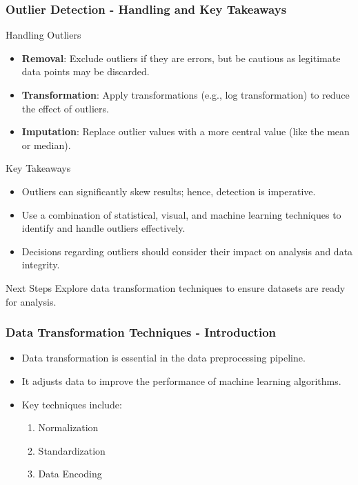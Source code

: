 \documentclass[aspectratio=169]{beamer}
\begin{document}
\begin{frame}[fragile]
    \frametitle{Outlier Detection - Handling and Key Takeaways}
    \begin{block}{Handling Outliers}
        \begin{itemize}
            \item \textbf{Removal}: Exclude outliers if they are errors, but be cautious as legitimate data points may be discarded.
            \item \textbf{Transformation}: Apply transformations (e.g., log transformation) to reduce the effect of outliers.
            \item \textbf{Imputation}: Replace outlier values with a more central value (like the mean or median).
        \end{itemize}
    \end{block}
    
    \begin{block}{Key Takeaways}
        \begin{itemize}
            \item Outliers can significantly skew results; hence, detection is imperative.
            \item Use a combination of statistical, visual, and machine learning techniques to identify and handle outliers effectively.
            \item Decisions regarding outliers should consider their impact on analysis and data integrity.
        \end{itemize}
    \end{block}
    
    \begin{block}{Next Steps}
        Explore data transformation techniques to ensure datasets are ready for analysis.
    \end{block}
\end{frame}

\begin{frame}[fragile]
    \frametitle{Data Transformation Techniques - Introduction}
    \begin{itemize}
        \item Data transformation is essential in the data preprocessing pipeline.
        \item It adjusts data to improve the performance of machine learning algorithms.
        \item Key techniques include:
        \begin{enumerate}
            \item Normalization
            \item Standardization
            \item Data Encoding
        \end{enumerate}
    \end{itemize}
\end{frame}
\end{document}
